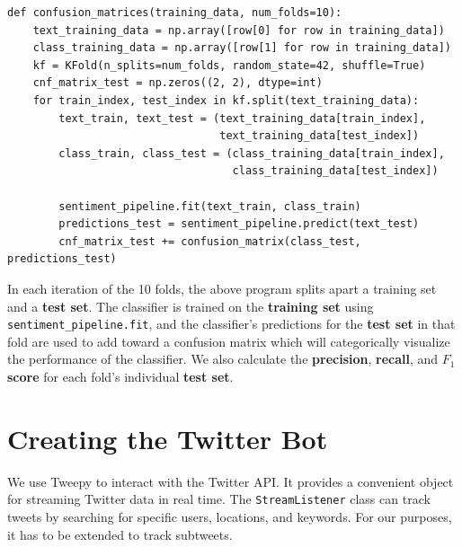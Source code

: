 \documentclass[11pt, twoside, reqno]{book}
\begin{document}
\begin{verbatim}
def confusion_matrices(training_data, num_folds=10):
    text_training_data = np.array([row[0] for row in training_data])
    class_training_data = np.array([row[1] for row in training_data])
    kf = KFold(n_splits=num_folds, random_state=42, shuffle=True)
    cnf_matrix_test = np.zeros((2, 2), dtype=int)
    for train_index, test_index in kf.split(text_training_data):
        text_train, text_test = (text_training_data[train_index], 
                                 text_training_data[test_index])
        class_train, class_test = (class_training_data[train_index], 
                                   class_training_data[test_index])

        sentiment_pipeline.fit(text_train, class_train)
        predictions_test = sentiment_pipeline.predict(text_test)
        cnf_matrix_test += confusion_matrix(class_test, predictions_test)
\end{verbatim}

\noindent
In each iteration of the 10 folds, the above program splits apart a training set and a \textbf{test set}. The classifier is trained on the \textbf{training set} using \verb|sentiment_pipeline.fit|, and the classifier's predictions for the \textbf{test set} in that fold are used to add toward a confusion matrix which will categorically visualize the performance of the classifier. We also calculate the \textbf{precision}, \textbf{recall}, and \textbf{$F_{1}$ score} for each fold's individual \textbf{test set}.

\section{Creating the Twitter Bot}
\label{creating_twitter_bot}

We use Tweepy to interact with the Twitter API. It provides a convenient object for streaming Twitter data in real time. The \verb|StreamListener| class can track tweets by searching for specific users, locations, and keywords. For our purposes, it has to be extended to track subtweets.
\end{document}
